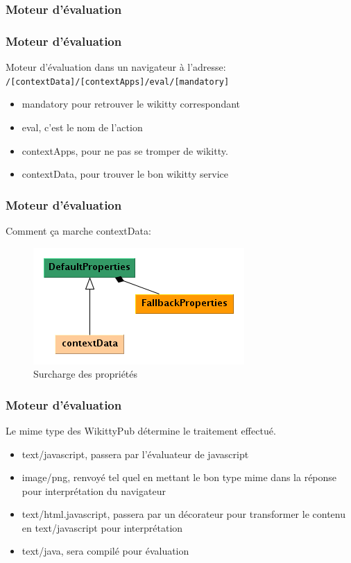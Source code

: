 \documentclass[12pt,a4paper,utf8x]{beamer}
\begin{document}
\subsubsection*{Moteur d'évaluation}
\begin{frame}\frametitle{Moteur d'évaluation}

Moteur d'évaluation dans un navigateur à l'adresse:\\
\verb!/[contextData]/[contextApps]/eval/[mandatory]!

\begin{itemize}
\item mandatory pour retrouver le wikitty correspondant
\item eval, c'est le nom de l'action
\item contextApps, pour ne pas se tromper de wikitty.
\item contextData, pour trouver le bon wikitty service
\end{itemize}



\end{frame}

\begin{frame}\frametitle{Moteur d'évaluation}

Comment ça marche contextData:

\begin{figure}
\includegraphics[scale=0.5]{../image/propertiescontext.png} 
\caption{Surcharge des propriétés}
\end{figure}

\end{frame}

\begin{frame}\frametitle{Moteur d'évaluation}
Le mime type des WikittyPub détermine le traitement effectué.
\begin{itemize}
\item text/javascript, passera par l'évaluateur de javascript
\item image/png, renvoyé tel quel en mettant le bon type mime dans la réponse 
pour interprétation du navigateur
\item text/html.javascript, passera par un décorateur pour transformer le contenu
en text/javascript pour interprétation
\item text/java, sera compilé pour évaluation
\end{itemize}
\end{frame}
\end{document}
